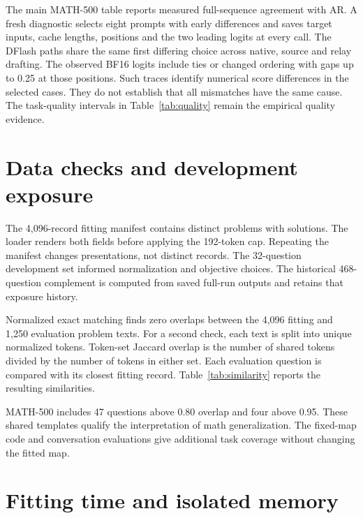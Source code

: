 \documentclass{article}
\begin{document}
The main MATH-500 table reports measured full-sequence agreement with AR.
A fresh diagnostic selects eight prompts with early differences and saves
target inputs, cache lengths, positions and the two leading logits at
every call. The DFlash paths share the same first differing choice across
native, source and relay drafting. The observed BF16 logits include ties
or changed ordering with gaps up to 0.25 at those positions. Such traces
identify numerical score differences in the selected cases. They do not
establish that all mismatches have the same cause. The task-quality
intervals in Table~\ref{tab:quality} remain the empirical quality evidence.

\section{Data checks and development exposure}
\label{app:data}

The 4,096-record fitting manifest contains distinct problems with solutions.
The loader renders both fields before applying the 192-token cap.
Repeating the manifest changes presentations, not distinct records.
The 32-question development set informed normalization and objective
choices. The historical 468-question complement is computed from saved
full-run outputs and retains that exposure history.

Normalized exact matching finds zero overlaps between the 4,096 fitting
and 1,250 evaluation problem texts. For a second check, each text is split
into unique normalized tokens. Token-set Jaccard overlap is the number of
shared tokens divided by the number of tokens in either set. Each
evaluation question is compared with its closest fitting record.
Table~\ref{tab:similarity} reports the resulting similarities.

\begin{table}[H]
\caption{Closest fitting-to-evaluation token-set overlap. Threshold
columns count evaluation records at or above the stated overlap.}
\label{tab:similarity}
\centering\small

\end{table}

MATH-500 includes 47 questions above 0.80 overlap and four above 0.95.
These shared templates qualify the interpretation of math generalization.
The fixed-map code and conversation evaluations give additional task
coverage without changing the fitted map.

\clearpage
\section{Fitting time and isolated memory}
\label{app:cost}
\end{document}
